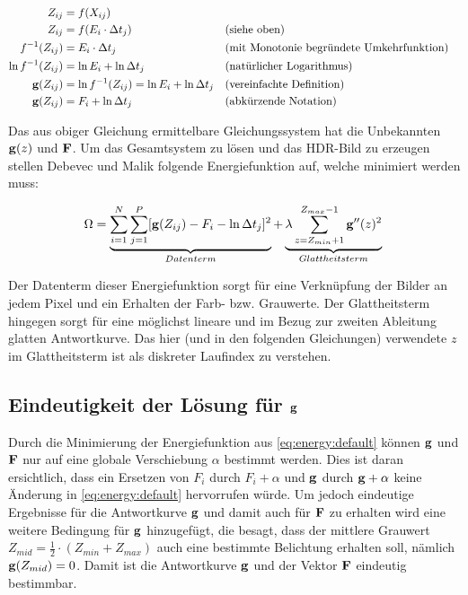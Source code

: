 \begin{align*}
Z_{ij} &= f(X_{ij})\\
Z_{ij} &=f(E_i \cdot \Delta t_j)&&\text{(siehe oben)}\\
f^{-1}(Z_{ij}) &= E_i \cdot \Delta t_j & &\text{(mit Monotonie begründete Umkehrfunktion)}\\
\ln f^{-1}(Z_{ij}) &= \ln E_i + \ln \Delta t_j&&\text{(natürlicher Logarithmus)}\\
\mathbf g(Z_{ij}) &= \ln f^{-1}(Z_{ij}) = \ln E_i + \ln \Delta t_j && \text{(vereinfachte Definition)}\\
\mathbf g(Z_{ij}) &= F_i + \ln \Delta t_j && \text{(abkürzende Notation)}\\
\end{align*}


Das aus obiger Gleichung ermittelbare Gleichungssystem hat die Unbekannten $\mathbf g(z)$ und $\mathbf F$. Um das Gesamtsystem zu lösen und das \gls{HDR}-Bild zu erzeugen stellen Debevec und Malik folgende Energiefunktion auf, welche minimiert werden muss:

\begin{equation}
\label{eq:energy:default}
\Omega = \underbrace{\sum \limits_{i=1}^{N} \sum \limits_{j=1}^{P}[\mathbf g(Z_{ij}) - F_i - \ln \Delta t_j]^2}_{Datenterm} + \underbrace{\lambda  \sum \limits_{z=Z_{min}+1}^{Z_{max}-1} \mathbf{g}''(z)^2}_{Glattheitsterm}\\
\end{equation}

Der Datenterm dieser Energiefunktion sorgt für eine Verknüpfung der Bilder an jedem Pixel und ein Erhalten der Farb- bzw. Grauwerte. Der Glattheitsterm hingegen sorgt für eine möglichst lineare und im Bezug zur zweiten Ableitung glatten Antwortkurve. Das hier (und in den folgenden Gleichungen) verwendete $z$ im Glattheitsterm ist als diskreter Laufindex zu verstehen. 

\subsection{Eindeutigkeit der Lösung für $\mathbf g$}
\label{sec:eindeutigkeit}
Durch die Minimierung der Energiefunktion aus \autoref{eq:energy:default} können $\mathbf g$ und $\mathbf F$ nur auf eine globale Verschiebung $\alpha$ bestimmt werden. Dies ist daran ersichtlich, dass ein Ersetzen von $F_i$ durch $F_i + \alpha$ und $\mathbf g$ durch $\mathbf g + \alpha$ keine Änderung in \autoref{eq:energy:default} hervorrufen würde. Um jedoch eindeutige Ergebnisse für die Antwortkurve $\mathbf g$ und damit auch für $\mathbf F$ zu erhalten wird eine weitere Bedingung für $\mathbf g$ hinzugefügt, die besagt, dass der mittlere Grauwert $Z_{mid} = \frac{1}{2}\cdot(Z_{min}+Z_{max})$ auch eine bestimmte  Belichtung erhalten soll, nämlich $\mathbf g(Z_{mid}) = 0$. Damit ist die Antwortkurve $\mathbf g$ und der Vektor $\mathbf F$ eindeutig bestimmbar.

